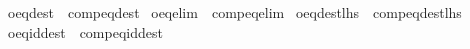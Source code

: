 \begin{isabellebody}
\isamarkupfalse%
\ o{\isacharunderscore}{\kern0pt}eq{\isacharunderscore}{\kern0pt}dest\ {\isacharequal}{\kern0pt}\ comp{\isacharunderscore}{\kern0pt}eq{\isacharunderscore}{\kern0pt}dest\isanewline
{}\isamarkupfalse%
\ o{\isacharunderscore}{\kern0pt}eq{\isacharunderscore}{\kern0pt}elim\ {\isacharequal}{\kern0pt}\ comp{\isacharunderscore}{\kern0pt}eq{\isacharunderscore}{\kern0pt}elim\isanewline
{}\isamarkupfalse%
\ o{\isacharunderscore}{\kern0pt}eq{\isacharunderscore}{\kern0pt}dest{\isacharunderscore}{\kern0pt}lhs\ {\isacharequal}{\kern0pt}\ comp{\isacharunderscore}{\kern0pt}eq{\isacharunderscore}{\kern0pt}dest{\isacharunderscore}{\kern0pt}lhs\isanewline
{}\isamarkupfalse%
\ o{\isacharunderscore}{\kern0pt}eq{\isacharunderscore}{\kern0pt}id{\isacharunderscore}{\kern0pt}dest\ {\isacharequal}{\kern0pt}\ comp{\isacharunderscore}{\kern0pt}eq{\isacharunderscore}{\kern0pt}id{\isacharunderscore}{\kern0pt}dest\isanewline
%
\isadelimtheory
\isanewline
%
\endisadelimtheory
%
\isatagtheory
{}\isamarkupfalse%
%
\endisatagtheory
{\isafoldtheory}%
%
\isadelimtheory
%
\endisadelimtheory
%
\end{isabellebody}%
\endinput
